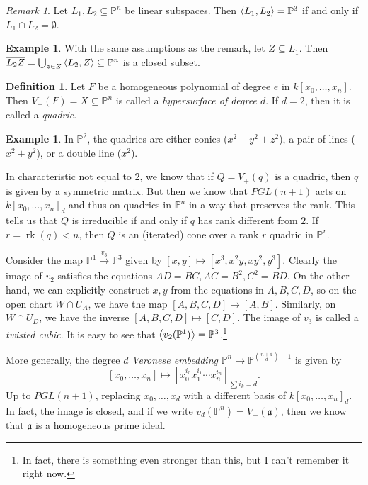 \documentclass[leqno, openany]{memoir}
\theoremstyle{definition}
\newtheorem{defn}[thm]{Definition}
\newtheorem{exm}[thm]{Example}
\theoremstyle{remark}
\newtheorem{rmk}[thm]{Remark}
\theoremstyle{plain}
\theoremstyle{definition}
\theoremstyle{remark}
\renewcommand{\P}{\mathbb{P}}
\newcommand{\mf}[1]{\mathfrak{#1}}
\newcommand{\ol}[1]{\overline{#1}}
\begin{document}
\begin{rmk}
    Let $L_1, L_2 \subseteq \P^n$ be linear subspaces. Then $\ev{L_1, L_2} = \P^3$ if and only if $L_1 \cap L_2 = \emptyset$.
\end{rmk}

\begin{exm}
    With the same assumptions as the remark, let $Z \subseteq L_1$. Then $\ol{L_2 Z} = \bigcup_{z \in Z} \ev{L_2, Z} \subseteq \P^n$ is a closed subset.
\end{exm}

\begin{defn}
    Let $F$ be a homogeneous polynomial of degree $e$ in $k[x_0, \ldots, x_n]$. Then $V_+(F) = X \subseteq \P^n$ is called a \textit{hypersurface of degree $d$}. If $d=2$, then it is called a \textit{quadric}. 
\end{defn}

\begin{exm}
    In $\P^2$, the quadrics are either conics ($x^2+y^2+z^2$), a pair of lines ($x^2+y^2$), or a double line ($x^2$).
\end{exm}

In characteristic not equal to $2$, we know that if $Q = V_+(q)$ is a quadric, then $q$ is given by a symmetric matrix. But then we know that $PGL(n+1)$ acts on ${k[x_0, \ldots, x_n]}_d$ and thus on quadrics in $\P^n$ in a way that preserves the rank. This tells us that $Q$ is irreducible if and only if $q$ has rank different from $2$. If $r = \operatorname{rk}(q) < n$, then $Q$ is an (iterated) cone over a rank $r$ quadric in $\P^r$.

Consider the map $\P^1 \xrightarrow{v_3} \P^3$ given by $[x,y] \mapsto [x^3, x^2y, xy^2, y^3]$. Clearly the image of $v_2$ satisfies the equations $AD = BC, AC = B^2, C^2 = BD$. On the other hand, we can explicitly construct $x,y$ from the equations in $A,B,C,D$, so on the open chart $W \cap U_A$, we have the map $[A,B,C,D] \mapsto [A,B]$. Similarly, on $W \cap U_D$, we have the inverse $[A,B,C,D] \mapsto [C,D]$. The image of $v_3$ is called a \textit{twisted cubic}. It is easy to see that $\ev{v_2(\P^1)} = \P^3$.\footnote{In fact, there is something even stronger than this, but I can't remember it right now.} 

More generally, the degree $d$ \textit{Veronese embedding} $\P^n \to \P^{\binom{n+d}{d}-1}$ is given by
\[ {[x_0, \ldots, x_n] \mapsto [x_0^{i_0}x_1^{i_1}\cdots x_n^{i_n}]}_{\sum i_k = d}. \]
Up to $PGL(n+1)$, replacing $x_0, \ldots, x_d$ with a different basis of ${k[x_0, \ldots, x_n]}_d$. In fact, the image is closed, and if we write $v_d(\P^n) = V_+(\mf{a})$, then we know that $\mf{a}$ is a homogeneous prime ideal.
\end{document}
